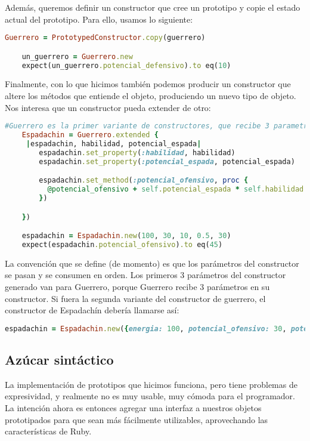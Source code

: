 \documentclass[spanish,a4paper]{article}
\begin{document}
\bigskip

Además, queremos definir un constructor que cree un prototipo y copie el estado actual del prototipo. Para ello, usamos lo siguiente:

\begin{lstlisting}[language=Ruby]
	Guerrero = PrototypedConstructor.copy(guerrero)

	un_guerrero = Guerrero.new
	expect(un_guerrero.potencial_defensivo).to eq(10)
\end{lstlisting}

Finalmente, con lo que hicimos también podemos producir un constructor que altere los métodos que entiende el objeto, produciendo un nuevo tipo de objeto. Nos interesa que un constructor pueda extender de otro:

\begin{lstlisting}[language=Ruby]
	#Guerrero es la primer variante de constructores, que recibe 3 parametros
	Espadachin = Guerrero.extended {
	 |espadachin, habilidad, potencial_espada|
		espadachin.set_property(:habilidad, habilidad)
		espadachin.set_property(:potencial_espada, potencial_espada)

		espadachin.set_method(:potencial_ofensivo, proc {
		  @potencial_ofensivo + self.potencial_espada * self.habilidad
		})

	})                                                          

	espadachin = Espadachin.new(100, 30, 10, 0.5, 30)
	expect(espadachin.potencial_ofensivo).to eq(45)
\end{lstlisting}

La convención que se define (de momento) es que los parámetros del constructor se pasan y se consumen en orden. Los primeros 3 parámetros del constructor generado van para Guerrero, porque Guerrero recibe 3 parámetros en su constructor. Si fuera la segunda variante del constructor de guerrero, el constructor de Espadachín debería llamarse así:

\begin{lstlisting}[language=Ruby]
	espadachin = Espadachin.new({energia: 100, potencial_ofensivo: 30, potencial_defensivo: 10}, 0.5, 30)
\end{lstlisting}



\subsection{Azúcar sintáctico}
La implementación de prototipos que hicimos funciona, pero tiene problemas de expresividad, y realmente no es muy usable, muy cómoda para el programador. La intención ahora es entonces agregar una interfaz a nuestros objetos prototipados para que sean más fácilmente utilizables, aprovechando las características de Ruby.
\end{document}
